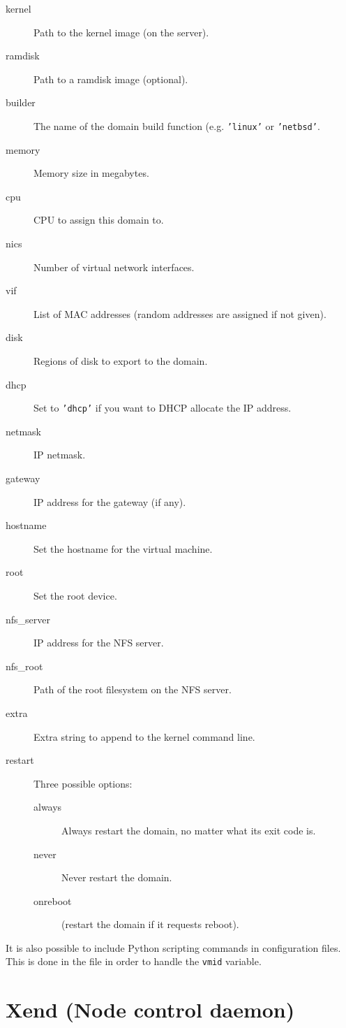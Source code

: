 \documentclass[11pt,twoside,final,openright]{xenstyle}
\begin{document}
\begin{description}
\item[kernel] Path to the kernel image (on the server).
\item[ramdisk] Path to a ramdisk image (optional).
\item[builder] The name of the domain build function (e.g. {\tt'linux'} or {\tt'netbsd'}.
\item[memory] Memory size in megabytes.
\item[cpu] CPU to assign this domain to.
\item[nics] Number of virtual network interfaces.
\item[vif] List of MAC addresses (random addresses are assigned if not given).
\item[disk] Regions of disk to export to the domain.
\item[dhcp] Set to {\tt 'dhcp'} if you want to DHCP allocate the IP address.
\item[netmask] IP netmask.
\item[gateway] IP address for the gateway (if any).
\item[hostname] Set the hostname for the virtual machine.
\item[root] Set the root device.
\item[nfs\_server] IP address for the NFS server.
\item[nfs\_root] Path of the root filesystem on the NFS server.
\item[extra] Extra string to append to the kernel command line.
\item[restart] Three possible options:
  \begin{description}
  \item[always] Always restart the domain, no matter what
                its exit code is.
  \item[never]  Never restart the domain.
  \item[onreboot] (restart the domain if it requests reboot).
  \end{description}
\end{description}

It is also possible to include Python scripting commands in
configuration files.  This is done in the  file in
order to handle the {\tt vmid} variable.


\chapter{Xend (Node control daemon)}
\label{cha:xend}
\end{document}
